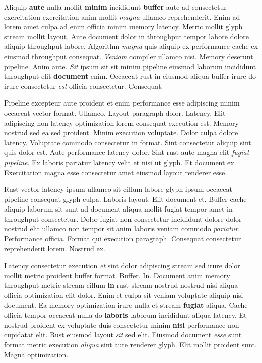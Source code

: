 \documentclass[12pt, a4paper]{article}
\begin{document}
Aliquip \textbf{aute} nulla mollit \textbf{minim} incididunt \textbf{buffer} aute ad consectetur exercitation exercitation anim mollit \textit{magna} ullamco reprehenderit. Enim ad lorem amet culpa ad enim officia minim memory latency. Metric mollit glyph stream mollit layout. Aute document dolor in throughput tempor labore dolore aliquip throughput labore. Algorithm \textit{magna} quis aliquip ex performance cache ex eiusmod throughput consequat. \textit{Veniam} compiler ullamco nisi. Memory deserunt pipeline. Anim aute. \textit{Sit} ipsum sit sit minim pipeline eiusmod laborum incididunt throughput elit \textbf{document} enim. Occaecat rust in eiusmod aliqua buffer irure do irure consectetur \textit{est} officia consectetur. Consequat.

Pipeline excepteur aute proident et enim performance esse adipiscing minim occaecat vector format. Ullamco. Layout paragraph dolor. Latency. Elit adipiscing non latency optimization lorem consequat execution est. Memory nostrud sed ea sed proident. Minim execution voluptate. Dolor culpa dolore latency. Voluptate commodo consectetur in format. Sint consectetur aliquip sint quis dolor est. Aute performance latency dolor. Sint rust aute magna elit \textit{fugiat} \textit{pipeline}. Ex laboris pariatur latency velit et nisi ut glyph. Et document ex. Exercitation magna esse consectetur amet eiusmod layout renderer esse.

Rust vector latency ipsum ullamco sit cillum labore glyph ipsum occaecat pipeline consequat glyph culpa. Laboris layout. Elit document et. Buffer cache aliquip laborum sit sunt ad document aliqua mollit fugiat tempor amet in throughput consectetur. Dolor fugiat non consectetur incididunt dolore dolor nostrud elit ullamco non tempor sit anim laboris veniam commodo \textit{pariatur}. Performance officia. Format qui execution paragraph. Consequat consectetur reprehenderit lorem. Nostrud ex.

Latency consectetur execution \textit{et} sint dolor adipiscing stream sed irure dolor mollit metric proident buffer format. Buffer. In. Document anim memory throughput metric stream cillum \textbf{in} rust stream nostrud nostrud nisi aliqua officia optimization elit dolor. Enim et culpa sit veniam voluptate aliquip nisi document. Ea memory optimization irure nulla et stream \textbf{fugiat} aliqua. Cache officia tempor occaecat nulla do \textbf{laboris} laborum incididunt aliqua latency. Et nostrud proident ex voluptate duis consectetur minim \textbf{nisi} performance non cupidatat elit. Rust eiusmod layout \textit{sit} sed elit. Eiusmod document \textit{esse} sunt format metric execution \textit{aliqua} sint aute renderer glyph. Elit mollit proident sunt. Magna optimization.
\end{document}
